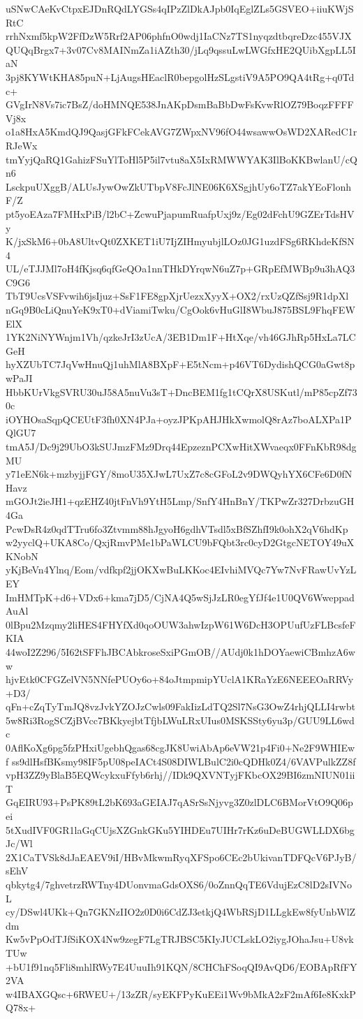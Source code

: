 uSNwCAeKvCtpxEJDnRQdLYGSs4qIPzZlDkAJpb0IqEglZLs5GSVEO+iiuKWjSRtC
rrhNxmf5kpW2FfDzW5Rrf2AP06phfnO0wdj1IaCNz7TS1nyqzdtbqreDzc455VJX
QUQqBrgx7+3v07Cv8MAINmZa1iAZth30/jLq9qssuLwLWGfxHE2QUibXgpLL5IaN
3pj8KYWtKHA85puN+LjAugsHEaclR0bepgolHzSLgstiV9A5PO9QA4tRg+q0Tdc+
GVgIrN8Vs7ic7BsZ/doHMNQE538JnAKpDsmBaBbDwFsKvwRlOZ79BoqzFFFFVj8x
o1a8HxA5KmdQJ9QasjGFkFCekAVG7ZWpxNV96fO44wsawwOsWD2XARedC1rRJeWx
tmYyjQaRQ1GahizFSuYlToHl5P5il7vtu8aX5IxRMWWYAK3IlBoKKBwlanU/cQn6
LsckpuUXggB/ALUsJywOwZkUTbpV8FcJlNE06K6XSgjhUy6oTZ7akYEoFlonhF/Z
pt5yoEAza7FMHxPiB/l2bC+ZcwuPjapumRuafpUxj9z/Eg02dFchU9GZErTdsHVy
K/jxSkM6+0bA8UltvQt0ZXKET1iU7IjZIHmyubjlLOz0JG1uzdFSg6RKhdeKfSN4
UL/eTJJMl7oH4fKjsq6qfGeQOa1nnTHkDYrqwN6uZ7p+GRpEfMWBp9u3hAQ3C9G6
TbT9UcsVSFvwih6jsIjuz+SsF1FE8gpXjrUezxXyyX+OX2/rxUzQZfSsj9R1dpXl
nGq9B0cLiQnuYeK9xT0+dViamiTwku/CgOok6vHuGlI8WbuJ875BSL9FhqFEWElX
1YK2NiNYWnjm1Vh/qzkeJrI3zUcA/3EB1Dm1F+HtXqe/vh46GJhRp5HxLa7LCGeH
hyXZUbTC7JqVwHnuQj1uhMlA8BXpF+E5tNcm+p46VT6DydishQCG0aGwt8pwPaJI
HbbKUrVkgSVRU30uJ58A5nuVu3sT+DncBEM1fg1tCQrX8USKutl/mP85cpZf730c
iOYHOsaSqpQCEUtF3fh0XN4PJa+oyzJPKpAHJHkXwmolQ8rAz7boALXPa1PQlGU7
tmA5J/Dc9j29UbO3kSUJmzFMz9Drq44EpzeznPCXwHitXWvaeqx0FFnKbR98dgMU
y71eEN6k+mzbyjjFGY/8moU35XJwL7UxZ7c8cGFoL2v9DWQyhYX6CFe6D0fNHavz
mGOJt2ieJH1+qzEHZ40jtFnVh9YtH5Lmp/SnfY4HnBnY/TKPwZr327DrbzuGH4Ga
PcwDsR4z0qdTTru6fo3Ztvmm88hJgyoH6gdhVTsdl5xBfSZhfI9k0ohX2qV6hdKp
w2yyclQ+UKA8Co/QxjRmvPMe1bPaWLCU9bFQbt3rc0cyD2GtgcNETOY49uXKNobN
yKjBeVn4Ylnq/Eom/vdfkpf2jjOKXwBuLKKoc4EIvhiMVQc7Yw7NvFRawUvYzLEY
ImHMTpK+d6+VDx6+kma7jD5/CjNA4Q5wSjJzLR0egYfJf4e1U0QV6WweppadAuAl
0lBpu2Mzqmy2liHES4FHYfXd0qoOUW3ahwIzpW61W6DcH3OPUufUzFLBcsfeFKIA
44woI2Z296/5I62tSFFhJBCAbkroseSxiPGmOB//AUdj0k1hDOYaewiCBmhzA6ww
hjvEtk0CFGZelVN5NNfePUOy6o+84oJtmpmipYUclA1KRaYzE6NEEEOaRRVy+D3/
qFn+cZqTyTmJQ8vzJvkYZOJzCwls09FakIizLdTQ2Sl7NsG3OwZ4rhjQLLI4rwbt
5w8Ri3RogSCZjBVcc7BKkyejbtTfjbLWuLRxUIus0MSKSSty6yu3p/GUU9LL6wdc
0AflKoXg6pg5fzPHxiUgebhQgas68cgJK8UwiAbAp6eVW21p4Fi0+Ne2F9WHIEwf
ss9dlHsfBKsmy98IF5pU08peIACt4S08DIWLBulC2i0cQDHk0Z4/6VAVPulkZZ8f
vpH3ZZ9yBlaB5EQWcykxuFfyb6rhj//IDk9QXVNTyjFKbcOX29BI6zmNIUN01iiT
GqEIRU93+PsPK89tL2bK693aGEIAJ7qASrSsNjyvg3Z0zlDLC6BMorVtO9Q06pei
5tXudIVF0GR1laGqCUjsXZGnkGKu5YIHDEu7UIHr7rKz6uDeBUGWLLDX6bgJc/Wl
2X1CaTVSk8dJaEAEV9iI/HBvMkwmRyqXFSpo6CEc2bUkivanTDFQcV6PJyB/sEhV
qbkytg4/7ghvetrzRWTny4DUonvmaGdsOXS6/0oZnnQqTE6VdujEzC8lD2sIVNoL
cy/DSwl4UKk+Qn7GKNzIIO2z0D0i6CdZJ3etkjQ4WbRSjD1LLgkEw8fyUnbWlZdm
Kw5vPpOdTJfSiKOX4Nw9zegF7LgTRJBSC5KIyJUCLskLO2iygJOhaJsu+U8vkTUw
+bU1f91nq5Fli8mhlRWy7E4UuuIh91KQN/8CHChFSoqQI9AvQD6/EOBApRfFY2VA
w4IBAXGQsc+6RWEU+/13zZR/syEKFPyKuEEi1Wv9bMkA2zF2mAf6Ie8KxkPQ78x+
